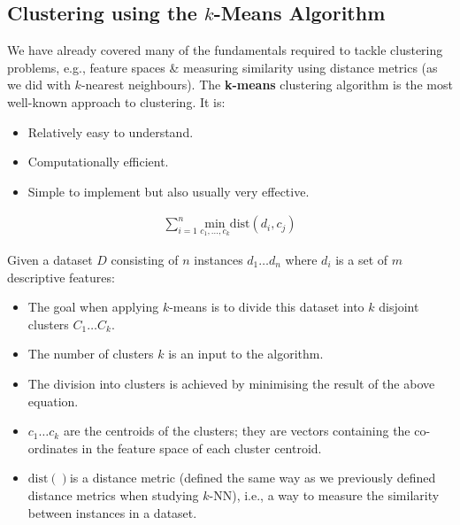 \documentclass[a4paper,11pt]{article}
\begin{document}
\subsection{Clustering using the $k$-Means Algorithm}
We have already covered many of the fundamentals required to tackle clustering problems, e.g., feature spaces \& measuring similarity using distance metrics (as we did with $k$-nearest neighbours).
The \textbf{k-means} clustering algorithm is the most well-known approach to clustering.
It is:
\begin{itemize}
    \item   Relatively easy to understand.
    \item   Computationally efficient.
    \item   Simple to implement but also usually very effective.
\end{itemize}

\begin{align*}
    \sum^n_{i=1} \underset{c_1, \dots, c_k}{\text{min}} \text{dist}(d_i, c_j)
\end{align*}

Given a dataset $D$ consisting of $n$ instances $d_1 \dots d_n$ where $d_i$ is a set of $m$ descriptive features:
\begin{itemize}
    \item   The goal when applying $k$-means is to divide this dataset into $k$ disjoint clusters $C_1 \dots C_k$.
    \item   The number of clusters $k$ is an input to the algorithm.
    \item   The division into clusters is achieved by minimising the result of the above equation.
    \item   $c_1 \dots c_k$ are the centroids of the clusters; they are vectors containing the co-ordinates in the feature space of each cluster centroid.
    \item   $\text{dist}()$is a distance metric (defined the same way as we previously defined distance metrics when studying $k$-NN), i.e., a way to measure the similarity between instances in a dataset.
\end{itemize}
\end{document}
